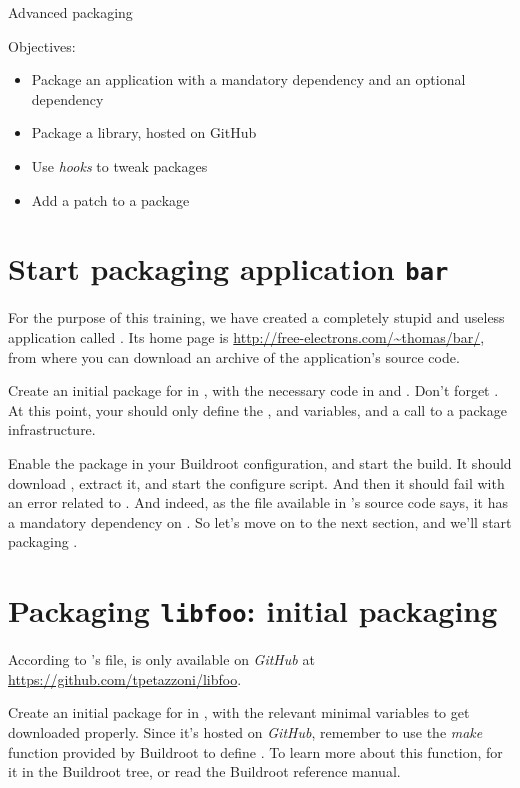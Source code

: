 \subchapter
{Advanced packaging}
{Objectives:
  \begin{itemize}
  \item Package an application with a mandatory dependency and an
    optional dependency
  \item Package a library, hosted on GitHub
  \item Use {\em hooks} to tweak packages
  \item Add a patch to a package
  \end{itemize}
}

\section{Start packaging application {\tt bar}}

For the purpose of this training, we have created a completely stupid
and useless application called . Its home page is
\url{http://free-electrons.com/~thomas/bar/}, from where you can
download an archive of the application's source code.

Create an initial package for  in , with
the necessary code in  and
. Don't forget
. At this point, your  should
only define the ,  and
 variables, and a call to a package infrastructure.

Enable the  package in your Buildroot configuration, and
start the build. It should download , extract it, and start
the configure script. And then it should fail with an error related to
. And indeed, as the  file available in
's source code says, it has a mandatory dependency on
. So let's move on to the next section, and we'll start
packaging .

\section{Packaging {\tt libfoo}: initial packaging}

According to 's  file,  is only
available on {\em GitHub} at
\url{https://github.com/tpetazzoni/libfoo}.

Create an initial package for  in ,
with the relevant minimal variables to get  downloaded
properly. Since it's hosted on {\em GitHub}, remember to use the
 {\em make} function provided by Buildroot to define
. To learn more about this function,  for
it in the Buildroot tree, or read the Buildroot reference manual.

